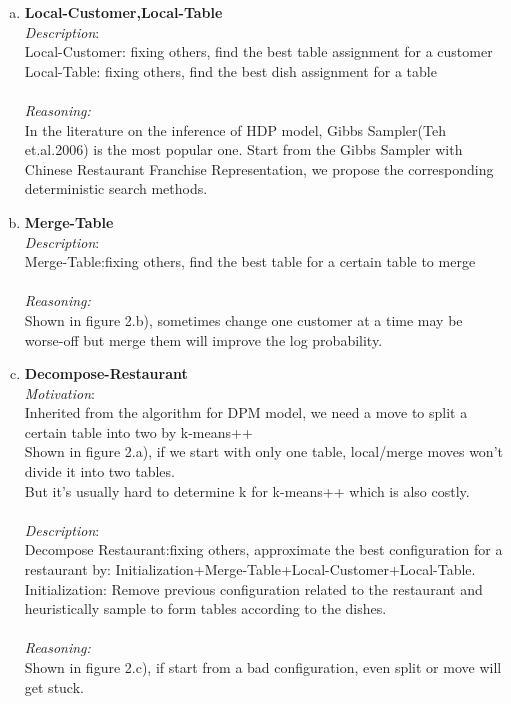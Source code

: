 \documentclass{article}
\begin{document}
\begin{enumerate}[(a)]
\item {\bf Local-Customer,Local-Table}\\
\emph{Description}:\\
Local-Customer: fixing others, find the best table assignment for a customer\\
Local-Table: fixing others, find the best dish assignment for a table\\\\
\emph{Reasoning:}\\ In the literature on the inference of HDP model, Gibbs Sampler(Teh et.al.2006) is the most popular one.
Start from the Gibbs Sampler with Chinese Restaurant Franchise Representation, we propose the corresponding deterministic search methods.\\
\item{\bf Merge-Table}\\
\emph{Description}:\\
Merge-Table:fixing others, find the best table for a certain table to merge\\ \\
\emph{Reasoning:}\\
Shown in figure 2.b), sometimes change one customer at a time may be worse-off but merge them will improve the log probability.
\item {\bf Decompose-Restaurant}\\
\emph{Motivation}:\\
Inherited from the algorithm for DPM model, we need a move to split a certain table into two by k-means++\\ 
Shown in figure 2.a), if we start with only one table, local/merge moves won't divide it into two tables.\\
But it's usually hard to determine k for k-means++ which is also costly.\\\\
\emph{Description}:\\
Decompose Restaurant:fixing others, approximate the best configuration for a restaurant by: Initialization+Merge-Table+Local-Customer+Local-Table.\\ 
Initialization: Remove previous configuration related to the restaurant and heuristically sample to form tables according to the dishes.\\\\
\emph{Reasoning:}\\
Shown in figure 2.c), if start from a bad configuration, even split or move will get stuck.

\end{enumerate}
\end{document}
